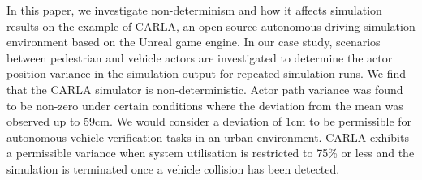 \documentclass[letterpaper, 10 pt, journal, twoside]{IEEEtran}
\begin{document}
In this paper, we investigate non-determinism and how it affects simulation results on the example of CARLA, an open-source autonomous driving simulation environment based on the Unreal game engine.
%
In our case study, scenarios between pedestrian and vehicle actors are investigated to determine the actor position variance in the simulation output for repeated simulation runs. 
%
%
We find that the CARLA simulator is non-deterministic. Actor path variance was found to be non-zero under certain conditions where the deviation from the mean was observed up to $59$cm. We would consider a deviation of $1$cm to be permissible for autonomous vehicle verification tasks in an urban environment. 
%
CARLA exhibits a permissible variance when system utilisation is restricted to 75\% or less and the simulation is terminated once a vehicle collision has been detected. 
%
\end{document}
